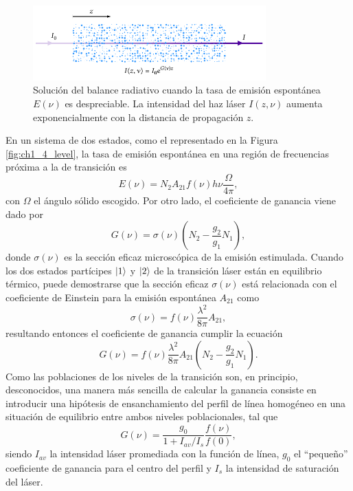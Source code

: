 \begin{figure}[htbp]
  \centering
  \includegraphics[width=0.8\textwidth]{Figuras/ch1_lambeer.pdf}
  \caption{Solución del balance radiativo cuando la tasa de emisión espontánea $E(\nu)$ es despreciable. La intensidad del haz láser $I(z,\nu)$ aumenta exponencialmente con la distancia de propagación $z$.}
  \label{fig:ch1_lambeer}
\end{figure}

En un sistema de dos estados, como el representado en la Figura \ref{fig:ch1_4_level}, la tasa de emisión espontánea en una región de frecuencias próxima a la de transición es \autocite{Tallents2003}
\begin{equation}\label{eq:2.15}
  E(\nu) = N_{2}A_{21}f(\nu)h \nu\frac{\Omega}{4 \pi},
\end{equation}
con $\Omega$ el ángulo sólido escogido. Por otro lado, el coeficiente de ganancia viene dado por
\begin{equation}\label{eq:2.16}
  G(\nu) = \sigma(\nu)\left(N_{2}-\frac{g_{2}}{g_{1}}N_{1}\right),
\end{equation}
donde $\sigma(\nu)$ es la sección eficaz microscópica de la emisión estimulada. Cuando los dos estados partícipes $\left|1\right\rangle$ y $\left|2\right\rangle$ de la transición láser están en equilibrio térmico, puede demostrarse que la sección eficaz $\sigma(\nu)$ está relacionada con el coeficiente de Einstein para la emisión espontánea $A_{21}$ como \autocite{Tallents2003}
\begin{equation}\label{eq:2.16}
  \sigma(\nu) = f(\nu)\frac{\lambda^{2}}{8 \pi}A_{21},
\end{equation}
resultando entonces el coeficiente de ganancia cumplir la ecuación
\begin{equation}\label{eq:2.17}
  G(\nu) = f(\nu)\frac{\lambda^{2}}{8 \pi}A_{21}\left(N_{2}-\frac{g_{2}}{g_{1}}N_{1}\right).
\end{equation}
Como las poblaciones de los niveles de la transición son, en principio, desconocidos, una manera más sencilla de calcular la ganancia consiste en introducir una hipótesis de ensanchamiento del perfil de línea homogéneo \autocite{Tallents2003} en una situación de equilibrio entre ambos niveles poblacionales, tal que
\begin{equation}\label{eq:2.18}
  G(\nu) = \frac{g_{0}}{1+I_{av}/I_{s}}\frac{f(\nu)}{f(0)},
\end{equation}
siendo $I_{av}$ la intensidad láser promediada con la función de línea, $g_{0}$ el \enquote{pequeño} coeficiente de ganancia para el centro del perfil y $I_{s}$ la intensidad de saturación del láser. 

